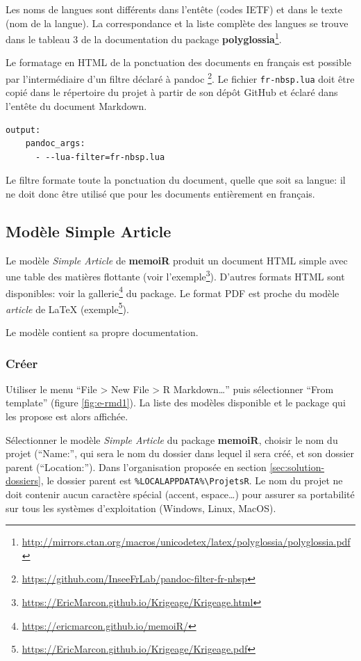 \documentclass[
  12pt,
  french,
  a4paper,
  extrafontsizes,onecolumn,openright
  ]{memoir}
\begin{document}
Les noms de langues sont différents dans l'entête (codes IETF) et dans le texte (nom de la langue).
La correspondance et la liste complète des langues se trouve dans le tableau 3 de la documentation du package \textbf{polyglossia}\footnote{\url{http://mirrors.ctan.org/macros/unicodetex/latex/polyglossia/polyglossia.pdf}}.

Le formatage en HTML de la ponctuation des documents en français est possible par l'intermédiaire d'un filtre déclaré à pandoc \footnote{\url{https://github.com/InseeFrLab/pandoc-filter-fr-nbsp}}.
Le fichier \texttt{fr-nbsp.lua} doit être copié dans le répertoire du projet à partir de son dépôt GitHub et éclaré dans l'entête du document Markdown.

\begin{verbatim}
output:
    pandoc_args:
      - --lua-filter=fr-nbsp.lua
\end{verbatim}

Le filtre formate toute la ponctuation du document, quelle que soit sa langue: il ne doit donc être utilisé que pour les documents entièrement en français.

\subsection{Modèle Simple Article}\label{sec:memo}

Le modèle \emph{Simple Article} de \textbf{memoiR} produit un document HTML simple avec une table des matières flottante (voir l'exemple\footnote{\url{https://EricMarcon.github.io/Krigeage/Krigeage.html}}).
D'autres formats HTML sont disponibles: voir la gallerie\footnote{\url{https://ericmarcon.github.io/memoiR/}} du package.
Le format PDF est proche du modèle \emph{article} de LaTeX (exemple\footnote{\url{https://EricMarcon.github.io/Krigeage/Krigeage.pdf}}).

Le modèle contient sa propre documentation.

\subsubsection{Créer}\label{cruxe9er}

Utiliser le menu \enquote{File \textgreater{} New File \textgreater{} R Markdown\ldots{}} puis sélectionner \enquote{From template} (figure \ref{fig:e-rmd1}).
La liste des modèles disponible et le package qui les propose est alors affichée.

Sélectionner le modèle \emph{Simple Article} du package \textbf{memoiR}, choisir le nom du projet (\enquote{Name:}, qui sera le nom du dossier dans lequel il sera créé, et son dossier parent (\enquote{Location:}).
Dans l'organisation proposée en section \ref{sec:solution-dossiers}, le dossier parent est \texttt{\%LOCALAPPDATA\%\textbackslash{}ProjetsR}.
Le nom du projet ne doit contenir aucun caractère spécial (accent, espace\ldots) pour assurer sa portabilité sur tous les systèmes d'exploitation (Windows, Linux, MacOS).
\end{document}
